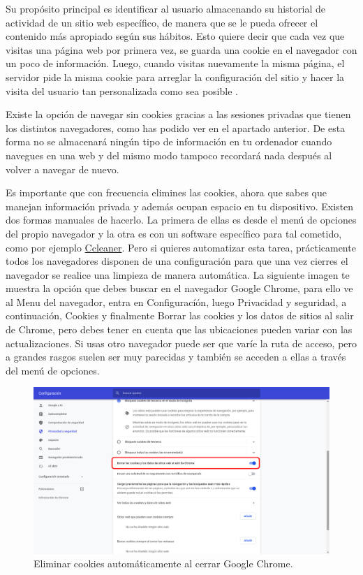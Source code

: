 \documentclass[
  spanish,
  a4paper,
  openany]{book}
\begin{document}
Su propósito principal es identificar al usuario almacenando su historial de actividad de un sitio web específico, de manera que se le pueda ofrecer el contenido más apropiado según sus hábitos. Esto quiere decir que cada vez que visitas una página web por primera vez, se guarda una cookie en el navegador con un poco de información. Luego, cuando visitas nuevamente la misma página, el servidor pide la misma cookie para arreglar la configuración del sitio y hacer la visita del usuario tan personalizada como sea posible \citep{cookies-navegador}.

Existe la opción de navegar sin cookies gracias a las sesiones privadas que tienen los distintos navegadores, como has podido ver en el apartado anterior. De esta forma no se almacenará ningún tipo de información en tu ordenador cuando navegues en una web y del mismo modo tampoco recordará nada después al volver a navegar de nuevo.

Es importante que con frecuencia elimines las cookies, ahora que sabes que manejan información privada y además ocupan espacio en tu dispositivo. Existen dos formas manuales de hacerlo. La primera de ellas es desde el menú de opciones del propio navegador y la otra es con un software específico para tal cometido, como por ejemplo \href{https://www.ccleaner.com/es-es}{Ccleaner}. Pero si quieres automatizar esta tarea, prácticamente todos los navegadores disponen de una configuración para que una vez cierres el navegador se realice una limpieza de manera automática. La siguiente imagen te muestra la opción que debes buscar en el navegador Google Chrome, para ello ve al Menu del navegador, entra en Configuracíón, luego Privacidad y seguridad, a continuación, Cookies y finalmente Borrar las cookies y los datos de sitios al salir de Chrome, pero debes tener en cuenta que las ubicaciones pueden variar con las actualizaciones. Si usas otro navegador puede ser que varíe la ruta de acceso, pero a grandes rasgos suelen ser muy parecidas y también se acceden a ellas a través del menú de opciones.

\begin{figure}

{\centering \includegraphics[width=0.75\linewidth]{images/borrado-cookies-cierre-navegador} 

}

\caption{Eliminar cookies automáticamente al cerrar Google Chrome.}\label{fig:unnamed-chunk-5}
\end{figure}
\end{document}
